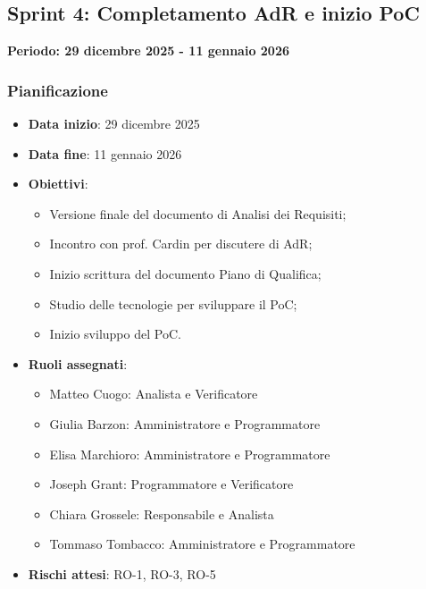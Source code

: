 \documentclass[11pt,a4paper]{article}
\begin{document}
\subsection{Sprint 4: Completamento AdR e inizio PoC}
{\textbf{Periodo: 29 dicembre 2025 - 11 gennaio 2026}\par}

\subsubsection{Pianificazione}
\begin{itemize}
    \item \textbf{Data inizio}: 29 dicembre 2025
    \item \textbf{Data fine}: 11 gennaio 2026
    \item \textbf{Obiettivi}:
    \begin{itemize}
        \item Versione finale del documento di Analisi dei Requisiti;
        \item Incontro con prof. Cardin per discutere di AdR;
        \item Inizio scrittura del documento Piano di Qualifica;
        \item Studio delle tecnologie per sviluppare il PoC;
        \item Inizio sviluppo del PoC.
    \end{itemize}
    \item \textbf{Ruoli assegnati}:
    \begin{itemize}
        \item Matteo Cuogo: Analista e Verificatore 
        \item Giulia Barzon: Amministratore e Programmatore
        \item Elisa Marchioro: Amministratore e Programmatore
        \item Joseph Grant: Programmatore e Verificatore
        \item Chiara Grossele: Responsabile e Analista
        \item Tommaso Tombacco: Amministratore e Programmatore 
    \end{itemize}
    \item \textbf{Rischi attesi}: RO-1, RO-3, RO-5
\end{itemize}
\end{document}
